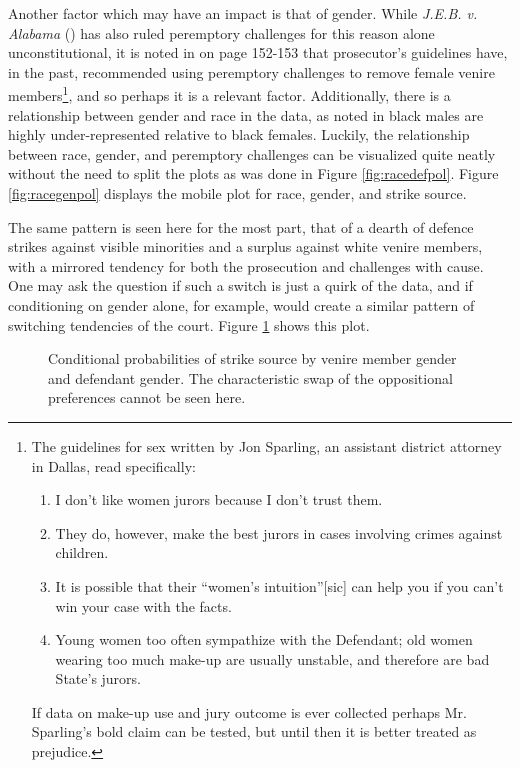 Another factor which may have an impact is that of gender. While \textit{J.E.B. v. Alabama} (\cite{jebvalabama}) has also ruled
peremptory challenges for this reason alone unconstitutional, it is noted in \cite{vandykejurysel} on page 152-153 that
prosecutor's guidelines have, in the past, recommended using peremptory challenges to remove female venire members\footnote{The
  guidelines for sex written by Jon Sparling, an assistant district attorney in Dallas, read specifically: \begin{enumerate}
  \item I don't like women jurors because I don't trust them.
  \item They do, however, make the best jurors in cases involving crimes against children.
  \item It is possible that their ``women's intuition''[sic] can help you if you can't win your case with the facts.
  \item Young women too often sympathize with the Defendant; old women wearing too much make-up are usually unstable, and
    therefore are bad State's jurors.
  \end{enumerate}
  If data on make-up use and jury outcome is ever collected perhaps Mr. Sparling's bold claim can be tested, but until then it is
  better treated as prejudice.}, and so perhaps it is a relevant factor. Additionally, there is a relationship between gender and
race in the data, as noted in \cite{JurySunshineProj} black males are highly under-represented relative to black females. Luckily,
the relationship between race, gender, and peremptory challenges can be visualized quite neatly without the need to split the
plots as was done in Figure \ref{fig:racedefpol}. Figure \ref{fig:racegenpol} displays the mobile plot for race, gender, and
strike source.

The same pattern is seen here for the most part, that of a dearth of defence strikes against visible minorities and a surplus
against white venire members, with a mirrored tendency for both the prosecution and challenges with cause. One may ask the
question if such a switch is just a quirk of the data, and if conditioning on gender alone, for example, would create a similar
pattern of switching tendencies of the court. Figure \ref{fig:gengen} shows this plot.

\begin{figure}[h!]
  \centering
  \caption[Strike Source by Race and Gender (Sunshine)]
  {\footnotesize Conditional probabilities of strike source by venire member gender and defendant gender. The characteristic swap of the
    oppositional preferences cannot be seen here.} \label{fig:gengen}
\end{figure}

